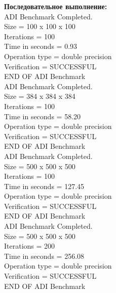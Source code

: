 \documentclass[a4paper,12pt,titlepage,draft]{article}
\begin{document}
\begin{minipage}{.5\textwidth}
\textbf{Последовательное выполнение:}\\

 ADI Benchmark Completed.\\
 Size            =  100 x  100 x  100\\
 Iterations      =                100\\
 Time in seconds =               0.93\\
 Operation type  =   double precision\\
 Verification    =         SUCCESSFUL\\
 END OF ADI Benchmark\\
 
 ADI Benchmark Completed.\\
 Size            =  384 x  384 x  384\\
 Iterations      =                100\\
 Time in seconds =              58.20\\
 Operation type  =   double precision\\
 Verification    =         SUCCESSFUL\\
 END OF ADI Benchmark\\

 ADI Benchmark Completed.\\
 Size            =  500 x  500 x  500\\
 Iterations      =                100\\
 Time in seconds =             127.45\\
 Operation type  =   double precision\\
 Verification    =         SUCCESSFUL\\
 END OF ADI Benchmark\\

 ADI Benchmark Completed.\\
 Size            =  500 x  500 x  500\\
 Iterations      =                200\\
 Time in seconds =             256.08\\
 Operation type  =   double precision\\
 Verification    =         SUCCESSFUL\\
 END OF ADI Benchmark\\
 
\end{minipage}
\end{document}
